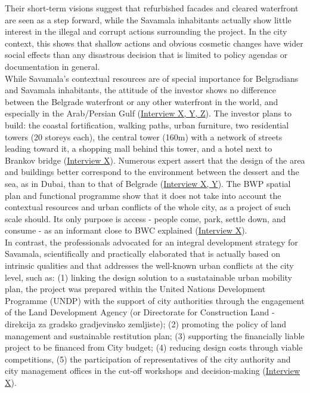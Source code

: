 \documentclass[11pt]{report}
\begin{document}
{{{{Their short-term visions suggest that refurbished facades and cleared waterfront are seen as a step forward, while the Savamala inhabitants actually show little interest in the illegal and corrupt actions surrounding the project. In the city context, this shows that shallow actions and obvious cosmetic changes have wider social effects than any disastrous decision that is limited to policy agendas or documentation in general.
\\

While Savamala's contextual resources are of special importance for Belgradians and Savamala inhabitants, the attitude of the investor shows no difference between the Belgrade waterfront or any other waterfront in the world, and especially in the Arab/Persian Gulf
(\href{InterviewX}{Interview X, Y, Z}).
The investor plans to build: the coastal fortification, walking paths, urban furniture, two residential towers (20 storeys each), the central tower (160m) with a network of streets leading toward it, a shopping mall behind this tower, and a hotel next to Brankov bridge (\href{InterviewX}{Interview X}).
Numerous expert assert that the design of the area and buildings better correspond to the environment between the dessert and the sea, as in Dubai, than to that of Belgrade 
(\href{InterviewX}{Interview X, Y}).
The BWP spatial plan and functional programme show that it does not take into account the contextual resources and urban conflicts of the whole city, as a project of such scale should. Its only purpose is access - people come, park, settle down, and consume - as an informant close to BWC explained 
(\href{InterviewX}{Interview X}).
\\

In contrast, the professionals advocated for an integral development strategy for Savamala, scientifically and practically elaborated that is actually based on intrinsic qualities and that addresses the well-known urban conflicts at the city level, such as: (1) linking the design solution to a sustatainable urban mobility plan, the project was prepared within the United Nations Development Programme (UNDP) with the support of city authorities through the engagement of the Land Development Agency (or Directorate for Construction Land - direkcija za gradsko gradjevinsko zemljiste); (2) promoting the policy of land management and sustainable restitution plan; (3) supporting the financially liable project to be financed from City budget; (4) reducing design costs through viable competitions, (5) the participation of representatives of the city authority and city management offices in the cut-off workshops and decision-making 
(\href{InterviewX}{Interview X}).
\\

}}}}
\end{document}
